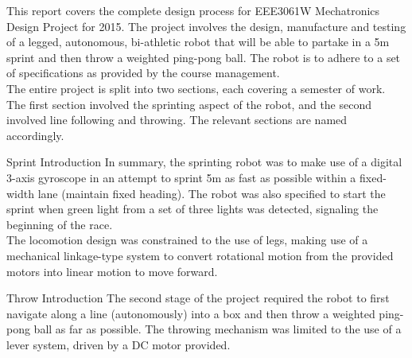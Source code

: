 \begin{homeworkProblem}[{Introduction}]
This report covers the complete design process for EEE3061W Mechatronics Design Project for 2015.  The project involves the design, manufacture and testing of a legged, autonomous, bi-athletic robot that will be able to partake in a 5m sprint and then throw a weighted ping-pong ball.  The robot is to adhere to a set of specifications as provided by the course management. \\

The entire project is split into two sections, each covering a semester of work.  The first section involved the sprinting aspect of the robot, and the second involved line following and throwing.  The relevant sections are named accordingly. \\

\begin{homeworkSection}{Sprint Introduction}
In summary, the sprinting robot was to make use of a digital 3-axis gyroscope in an attempt to sprint 5m as fast as possible within a fixed-width lane (maintain fixed heading).  The robot was also specified to start the sprint when green light from a set of three lights was detected, signaling the beginning of the race. \\

The locomotion design was constrained to the use of legs, making use of a mechanical linkage-type system to convert rotational motion from the provided motors into linear motion to move forward.

\end{homeworkSection}

\begin{homeworkSection}{Throw Introduction}
The second stage of the project required the robot to first navigate along a line (autonomously) into a box and then throw a weighted ping-pong ball as far as possible. The throwing mechanism was limited to the use of a lever system, driven by a DC motor provided.

\end{homeworkSection}


\end{homeworkProblem}
